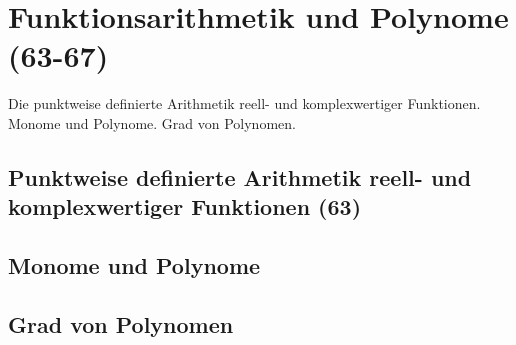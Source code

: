 \section{Funktionsarithmetik und Polynome (63-67)}
 
Die punktweise definierte Arithmetik reell- und komplexwertiger Funktionen. Monome und Polynome. Grad von Polynomen. 

\subsection{Punktweise definierte Arithmetik reell- und komplexwertiger Funktionen (63)}

\subsection{Monome und Polynome}

\subsection{Grad von Polynomen}
